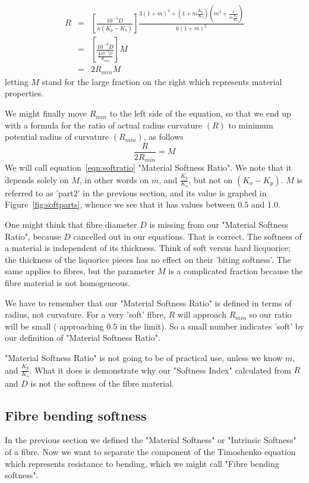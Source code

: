 \documentclass[titlepage]{article}  %
\begin{document}
\begin{eqnarray*}
R & = & \left[ \frac{10^{-3}D}{\kappa (K_{p} - K_{o})} \right] \frac{ 3(1+m)^{2}+(1+m \frac{K_{p}}{K_{o}})(m^{2}+\frac{1}{m \frac{K_{p}}{K_{o}}})} {6(1+m)^{2}} \\
  & = &  \left[ \frac{10^{-3}D} {\frac{\frac{1}{2}10^{-3}D}{R_{min}} } \right] M \\
  & = & 2 R_{min} M
\end{eqnarray*}
letting $M$ stand for the large fraction on the right which represents material properties.

We might finally move $R_{min}$ to the left side of the equation, so that we end up with a formula for the ratio of actual radius curvature $(R)$ to minimum potential radius of curvature $(R_{min})$, as follows
\begin{equation}
\label{eqn:softratio}
\frac{R}{2 R_{min}} =  M
\end{equation}
 We will call equation~\ref{eqn:softratio} "Material Softness Ratio". We note that it depends solely on $M$, in other words on $m$, and $\frac{K_{p}}{K_{o}}$, but not on $(K_{o} - K_{p})$.  $M$ is referred to as 'part2' in the previous section, and its value is graphed in Figure~\ref{fig:softparts}, whence we see that it has values between $0.5$ and $1.0$.  

One might think that fibre diameter $D$ is missing from our "Material Softness Ratio", because $D$ cancelled out in our equations. That is correct. The softness of a material is independent of its thickness. Think of soft versus hard licquorice; the thickness of the liquorice pieces has no effect on their 'biting softness'. The same applies to fibres, but the parameter $M$ is a complicated fraction because the fibre material is not homogeneous. 

We have to remember that our "Material Softness Ratio" is defined in terms of radius, not curvature. For a very 'soft' fibre, $R$ will approach $R_{min}$ so our ratio will be small ( approaching $0.5$ in the limit). So a small number indicates 'soft' by our definition of "Material Softness Ratio". 

"Material Softness Ratio" is not going to be of practical use, unless we know $m$, and $\frac{K_{p}}{K_{o}}$. What it does is demonstrate why our "Softness Index" calculated from $R$ and $D$ is not the softness of the fibre material.

\subsection{Fibre bending softness}
In the previous section we defined the "Material Softness" or "Intrinsic Softness" of a fibre. Now we want to separate the component of the Timoshenko equation which represents resistance to bending, which we might call "Fibre bending softness". 
\end{document}
